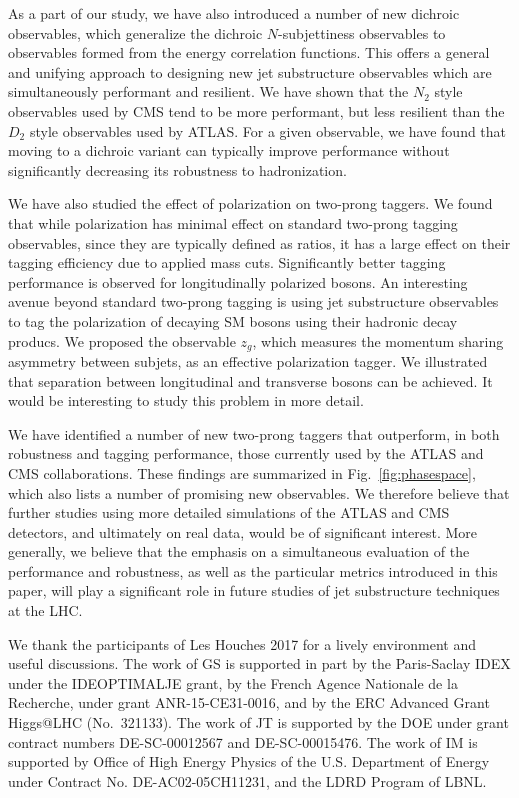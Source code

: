 \documentclass[11pt,letterpaper]{article}
\DeclareRobustCommand{\Fig}[1]{Fig.~\ref{#1}}
\begin{document}
As a part of our study, we have also introduced a number of new dichroic observables, which generalize the dichroic $N$-subjettiness observables to observables formed from the energy correlation functions. This offers a general and unifying approach to designing new jet substructure observables which are simultaneously performant and resilient. We have shown that the $N_2$ style observables used by CMS tend to be more performant, but less resilient than the $D_2$ style observables used by ATLAS. For a given observable, we have found that moving to a dichroic variant can typically improve performance without significantly decreasing its robustness to hadronization.

We have also studied the effect of polarization on two-prong taggers. We found that while polarization has minimal effect on standard two-prong tagging observables, since they are typically defined as ratios, it has a large effect on their tagging efficiency due to applied mass cuts. Significantly better tagging performance is observed for longitudinally polarized bosons. An interesting avenue beyond standard two-prong tagging is using jet substructure observables to tag the polarization of decaying SM bosons using their hadronic decay producs. We proposed the observable $z_g$, which measures the momentum sharing asymmetry between subjets, as an effective polarization tagger. We illustrated that separation between longitudinal and transverse bosons can be achieved. It would be interesting to study this problem in more detail.


We have identified a  number of new two-prong taggers that outperform, in both robustness and tagging performance, those currently used by the ATLAS and CMS collaborations. These findings are summarized in \Fig{fig:phasespace}, which also lists a number of promising new observables. We therefore believe that further studies using more detailed simulations of the ATLAS and CMS detectors, and ultimately on real data, would be of significant interest. More generally, we believe that the emphasis on a simultaneous evaluation of the performance and robustness, as well as the particular metrics introduced in this paper, will play a significant role in future studies of jet substructure techniques at the LHC.

\begin{acknowledgments}

We thank the participants of Les Houches 2017 for a lively environment and useful discussions. The work of GS is supported in part by the Paris-Saclay IDEX under the
IDEOPTIMALJE grant, by the French Agence Nationale de la Recherche,
under grant ANR-15-CE31-0016, and by the ERC Advanced Grant Higgs@LHC
(No.\ 321133).
%
The work of JT is supported by the DOE under grant contract numbers DE-SC-00012567 and DE-SC-00015476.
%
The work of IM is supported by Office of High Energy Physics of the U.S. Department of Energy under Contract No. DE-AC02-05CH11231, and the LDRD Program of LBNL.


\end{acknowledgments}




\end{document}
